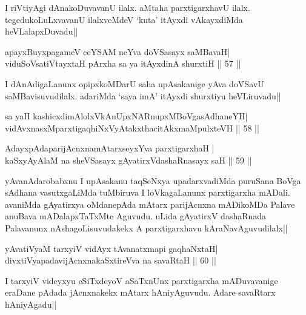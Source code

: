\begin{artha} 
I riVtiyAgi dAnakoDuvavanU ilalx. aMtaha parxtigarxhavU ilalx. 
tegedukoLuLxvavanU ilalxveMdeV `kuta' itAyxdi vAkayxdiMda 
heVLalapxDuvadu||
\end{artha}


\begin{shl}
apayxBuyxpagameV ceYSAM neYva doVSasayx saMBavaH| \\
viduSoV\s satiVtayxtaH pArxha sa ya itAyxdinA shurxtiH \hfill ||  57 || 
\end{shl}

\begin{artha} 
I dAnAdigaLanunx opipxkoMDarU saha upAsakanige yAva doVSavU 
saMBavisuvudilalx. adariMda `saya imA' itAyxdi shurxtiyu heVLiruvadu||
\end{artha}


\begin{shl}
sa yaH kashicxdimAlolxVkAnUpxNARnupxMBoVgasAdhaneYH| \\
vidAvxnasxMparxtigaqhiNxVyAtakxthacitAkxmaMpulxteVH \hfill ||  58 || 
\end{shl}

\begin{shl}
AdayxpAdaparijAcnxnamAtarxseyxYva parxtigarxhaH | \\
kaSxyAyAlaM na sheVSasayx gAyatirxVdashaRnasayx saH \hfill ||  59 || 
\end{shl}

\begin{artha} 
yAvanAdarobabxnu I upAsakanu taqSeNxya upadarxvadiMda puruSana BoVga 
sAdhana vasutxgaLiMda tuMbiruva I loVkagaLanunx parxtigarxha mADali. 
avaniMda gAyatirxya oMdanepAda mAtarx parijAcnxna mADikoMDa Palave 
anuBava mADalapxTaTxMte Aguvudu. uLida gAyatirxV dashaRnada Palavanunx 
nAshagoLisuvudakekx A parxtigarxhavu kAraNavAguvudilalx||  
\end{artha}


\begin{shl}
yAvatiVyaM tarxyiV vidAyx tAvanatxmapi gaqhaNxtaH| \\
divxtiVyapadavijAcnxnakaSxtireVva na savaRtaH \hfill ||  60 || 
\end{shl}

\begin{artha} 
I tarxyiV videyxyu eSiTxdeyoV aSaTxnUnx parxtigarxha mADuvavanige 
eraDane pAdada jAcnxnakekx mAtarx hAniyAguvudu. Adare savaRtarx 
hAniyAgadu||
\end{artha}

